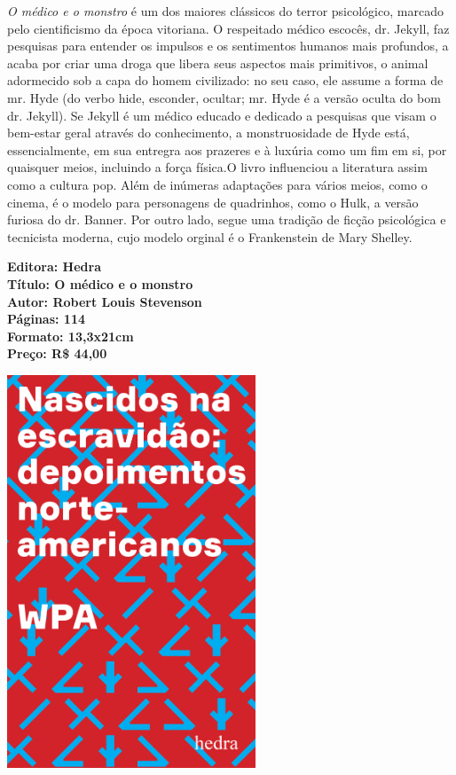 \noindent{}\textit{O médico e o monstro} é um dos maiores clássicos do terror psicológico, marcado pelo cientificismo da época vitoriana. O respeitado médico escocês, dr. Jekyll, faz pesquisas para entender os impulsos e os sentimentos humanos mais profundos, a acaba por criar uma droga que libera seus aspectos mais primitivos, o animal adormecido sob a capa do homem civilizado: no seu caso, ele assume a forma de mr. Hyde (do verbo hide, esconder, ocultar; mr. Hyde é a versão oculta do bom dr. Jekyll). Se Jekyll é um médico educado e dedicado a pesquisas que visam o bem-estar geral através do conhecimento, a monstruosidade de Hyde está, essencialmente, em sua entregra aos prazeres e à luxúria como um fim em si, por quaisquer meios, incluindo a força física.O livro influenciou a literatura assim como a cultura pop. Além de inúmeras adaptações para vários meios, como o cinema, é o modelo para personagens de quadrinhos, como o Hulk, a versão furiosa do dr. Banner. Por outro lado, segue uma tradição de ficção psicológica e tecnicista moderna, cujo modelo orginal é o Frankenstein de Mary Shelley.

\vfill

\noindent\begin{minipage}[c]{1\linewidth}
{\small\textbf{
\hspace*{-.1cm}Editora: Hedra\\
Título: O médico e o monstro\\
Autor: Robert Louis Stevenson\\ 
Páginas: 114\\
Formato: 13,3x21cm\\
Preço: R\$ 44,00\\
}}
\end{minipage}

\pagebreak

\begin{center}
\hspace*{.5cm}\includegraphics[width=74mm]{./grid/nascidos.jpeg}
\end{center}

